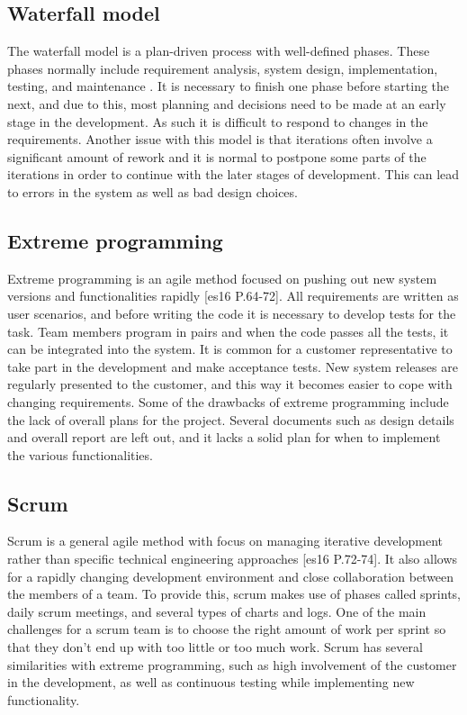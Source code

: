 \subsection{Waterfall model}
The waterfall model is a plan-driven process with well-defined phases. These phases normally include requirement analysis, system design, implementation, testing, and maintenance \cite[p.30-32]{Sommerville}. It is necessary to finish one phase before starting the next, and due to this, most planning and decisions need to be made at an early stage in the development. As such it is difficult to respond to changes in the requirements. Another issue with this model is that iterations often involve a significant amount of rework and it is normal to postpone some parts of the iterations in order to continue with the later stages of development. This can lead to errors in the system as well as bad design choices.

\subsection{Extreme programming}
Extreme programming is an agile method focused on pushing out new system versions and functionalities rapidly [es16 P.64-72]. All requirements are written as user scenarios, and before writing the code it is necessary to develop tests for the task. Team members program  in pairs and when the code passes all the tests, it can be integrated into the system.  It is common for a customer representative to take part in the development and make acceptance tests. New system releases are regularly presented to the customer, and this way it becomes easier to cope with changing requirements. Some of the drawbacks of extreme programming include the lack of overall plans for the project. Several documents such as design details and overall report are left out, and it lacks a solid plan for when to implement the various functionalities.


\subsection{Scrum }
\label{sec_scrum}
Scrum is a general agile method with focus on managing iterative development rather than specific technical engineering approaches [es16 P.72-74]. It also allows for a rapidly changing development environment and close collaboration between the members of a team. To provide this, scrum makes use of phases called sprints, daily scrum meetings, and several types of charts and logs. One of the main challenges for a scrum team is to choose the right amount of work per sprint so that they don’t end up with too little or too much work. Scrum has several similarities with extreme programming, such as high involvement of the customer in the development, as well as continuous testing while implementing new functionality.

